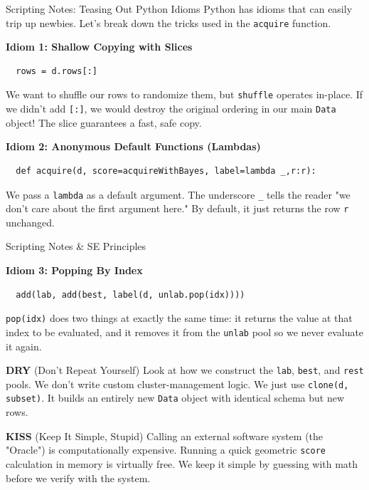 \begin{frame}[fragile]{Scripting Notes: Teasing Out Python Idioms}
  \vspace{0.2cm}
  Python has idioms that can easily trip up newbies. Let's break down the tricks used in the \texttt{acquire} function.

  \vspace{0.3cm}
  \textbf{Idiom 1: Shallow Copying with Slices}
  \begin{verbatim}
  rows = d.rows[:]
  \end{verbatim}
  We want to shuffle our rows to randomize them, but \texttt{shuffle} operates in-place. If we didn't add \texttt{[:]}, we would destroy the original ordering in our main \texttt{Data} object! The slice guarantees a fast, safe copy.
  
  \vspace{0.3cm}
  \textbf{Idiom 2: Anonymous Default Functions (Lambdas)}
  \begin{verbatim}
  def acquire(d, score=acquireWithBayes, label=lambda _,r:r):
  \end{verbatim}
  We pass a \texttt{lambda} as a default argument. The underscore \texttt{\_} tells the reader "we don't care about the first argument here." By default, it just returns the row \texttt{r} unchanged.
\end{frame}

\begin{frame}[fragile]{Scripting Notes \& SE Principles}
  
  \vspace{0.2cm}
  \textbf{Idiom 3: Popping By Index}
  \begin{verbatim}
  add(lab, add(best, label(d, unlab.pop(idx))))
  \end{verbatim}
  \texttt{pop(idx)} does two things at exactly the same time: it returns the value at that index to be evaluated, and it removes it from the \texttt{unlab} pool so we never evaluate it again. 

  \vspace{0.4cm}
  \begin{block}{\textbf{DRY} (Don't Repeat Yourself)}
  Look at how we construct the \texttt{lab}, \texttt{best}, and \texttt{rest} pools. We don't write custom cluster-management logic. We just use \texttt{clone(d, subset)}. It builds an entirely new \texttt{Data} object with identical schema but new rows. 
  \end{block}

  \begin{block}{\textbf{KISS} (Keep It Simple, Stupid)}
  Calling an external software system (the "Oracle") is computationally expensive. Running a quick geometric \texttt{score} calculation in memory is virtually free. We keep it simple by guessing with math before we verify with the system.
  \end{block}
\end{frame}
